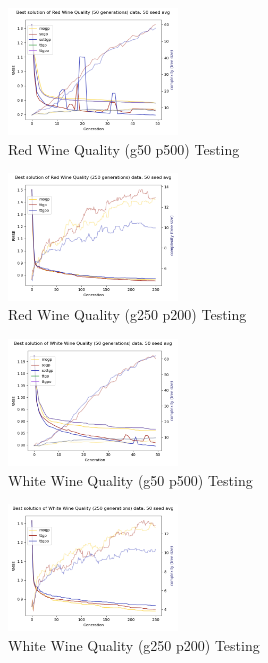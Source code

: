 \documentclass[a4paper, twocolumn]{article}
\begin{document}
\clearpage
\begin{figure}[t]
	\caption{Red Wine Quality (g50 p500) Testing}
	\includegraphics[width=0.40\textwidth]{Red Wine Quality (50 generations)-best-evo}
\end{figure}
\begin{figure}[t]
	\caption{Red Wine Quality (g250 p200) Testing}
	\includegraphics[width=0.40\textwidth]{Red Wine Quality (250 generations)-best-evo}
\end{figure}
\begin{figure}[t]
	\caption{White Wine Quality (g50 p500) Testing}
	\includegraphics[width=0.40\textwidth]{White Wine Quality (50 generations)-best-evo}
\end{figure}
\begin{figure}[t]
	\caption{White Wine Quality (g250 p200) Testing}
	\includegraphics[width=0.40\textwidth]{White Wine Quality (250 generations)-best-evo}
\end{figure}
\end{document}
